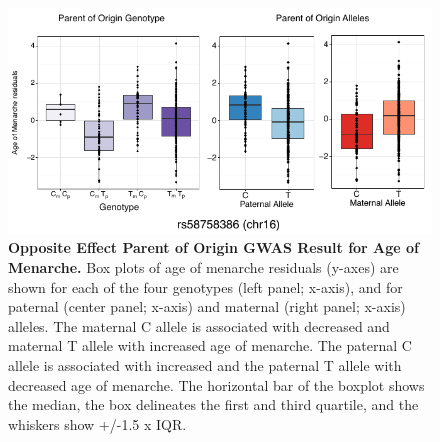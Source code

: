 \begin{figure}[!htb]
\centering \includegraphics[width=5in]{img/ch02/fig-03-menarche_oegwas.pdf}
\caption[Opposite Effect Parent of Origin GWAS Result for Age of Menarche.]{\textbf{Opposite Effect Parent of Origin GWAS Result for Age of Menarche.}  Box plots of age of menarche residuals (y-axes) are shown for each of the four genotypes (left panel; x-axis), and for paternal (center panel; x-axis) and maternal (right panel; x-axis) alleles. The maternal C allele is associated with decreased and maternal T allele with increased age of menarche. The paternal C allele is associated with increased and the paternal T allele with decreased age of menarche. The horizontal bar of the boxplot shows the median, the box delineates the first and third quartile, and the whiskers show +/-1.5 x IQR.}
\label{fig:menarche_oegwas}
\end{figure}


